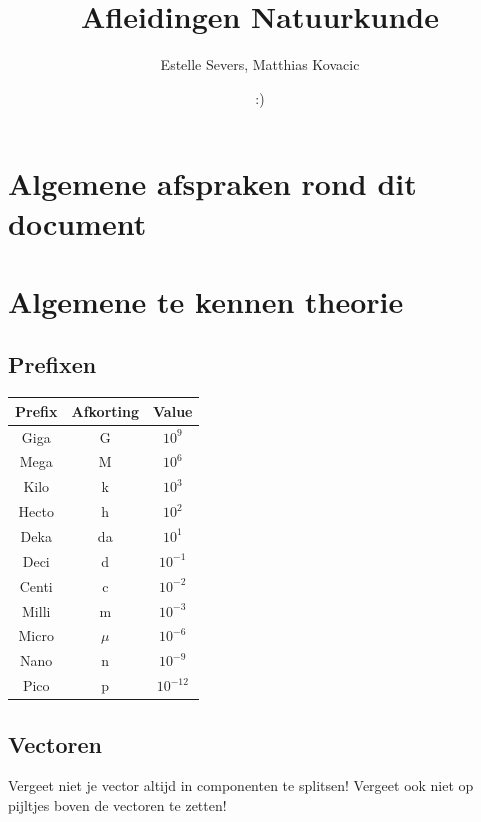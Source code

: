 \documentclass[12pt,a4paper]{article}
\author{Estelle Severs, Matthias Kovacic}
\title{Afleidingen Natuurkunde}
\date{:)}
\begin{document}
    \maketitle
    \tableofcontents
    \newpage


    \section{Algemene afspraken rond dit document}


    \section{Algemene te kennen theorie}

    \subsection{Prefixen}
    \begin{center}
        \begin{tabular}{ | c | c | c | }
            \hline
            Prefix & Afkorting & Value      \\
            \hline
            Giga   & G         & $10^{9}$   \\
            Mega   & M         & $10^{6}$   \\
            Kilo   & k         & $10^{3}$   \\
            Hecto  & h         & $10^{2}$   \\
            Deka   & da        & $10^{1}$   \\
            Deci   & d         & $10^{-1}$  \\
            Centi  & c         & $10^{-2}$  \\
            Milli  & m         & $10^{-3}$  \\
            Micro  & $\mu$     & $10^{-6}$  \\
            Nano   & n         & $10^{-9}$  \\
            Pico   & p         & $10^{-12}$ \\
            \hline
        \end{tabular}
    \end{center}

    \subsection{Vectoren}
    Vergeet niet je vector altijd in componenten te splitsen! Vergeet ook niet op pijltjes boven de vectoren te zetten!
\end{document}
